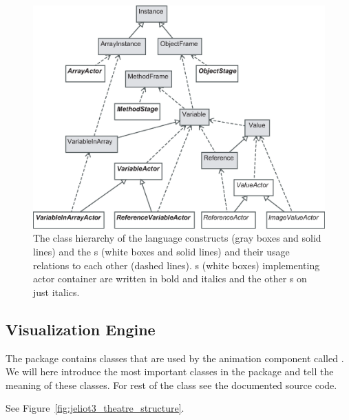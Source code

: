 \begin{figure}[!htb]
\begin{center}
\includegraphics[width=\textwidth]{images/language_constructs_and_actors.eps}
\caption{The class hierarchy of the language constructs (gray boxes and solid lines) and the s (white boxes and solid lines) and their usage relations to each other (dashed lines). s (white boxes) implementing actor container are written in bold and italics and the other s on just italics.}
\label{fig:language_constructs_and_actors}
\end{center}
\end{figure}

\subsection{Visualization Engine}
\label{sec:Visualization_Engine}

The package  contains classes that are used by the animation
component called . We will here introduce the most important
classes in the package and tell the meaning of these classes. For rest of
the class see the documented source code.

See Figure~\ref{fig:jeliot3_theatre_structure}.

